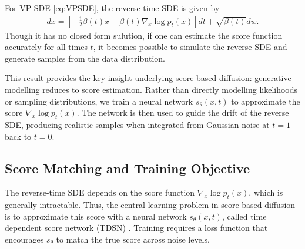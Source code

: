 \documentclass[a4paper,12pt]{article}
\begin{document}
For VP SDE \cref{eq:VPSDE}, the reverse-time SDE is given by
\begin{align*}
    dx=\left[-\frac{1}{2}\beta\!\left(t\right)x-\beta\!\left(t\right)\nabla_x \log p_t(x)\right]dt+\sqrt{\beta\!\left(t\right)}d\bar w.
\end{align*}
Though it has no closed form sulution, if one can estimate the score function accurately for all times \(t\), it becomes possible to simulate the reverse SDE and generate samples from the data distribution.

This result provides the key insight underlying score-based diffusion: generative modelling reduces to score estimation. 
Rather than directly modelling likelihoods or sampling distributions, we train a neural network \(s_\theta(x,t)\) to approximate the score \(\nabla_x \log p_t(x)\). The network is then used to guide the drift of the reverse SDE, producing realistic samples when integrated from Gaussian noise at \(t = 1\) back to \(t = 0\).

\subsection{Score Matching and Training Objective}
The reverse-time SDE depends on the score function \(\nabla_x \log p_t(x)\), which is generally intractable. Thus, the central learning problem in score-based diffusion is to approximate this score with a neural network \(s_\theta(x,t)\), called time dependent score network (TDSN) \citep{song2021ScoreBasedGenerativeModeling}. Training requires a loss function that encourages \(s_\theta\) to match the true score across noise levels.
\end{document}
